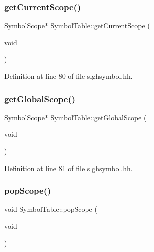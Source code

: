 \subsubsection{\texorpdfstring{getCurrentScope()}{getCurrentScope()}}
{\footnotesize\ttfamily \mbox{\hyperlink{class_symbol_scope}{Symbol\+Scope}}$\ast$ Symbol\+Table\+::get\+Current\+Scope (\begin{DoxyParamCaption}\item[{void}]{ }\end{DoxyParamCaption})\hspace{0.3cm}{\ttfamily [inline]}}



Definition at line 80 of file slghsymbol.\+hh.

\mbox{\label{class_symbol_table_a66d6512a45da8f2fc3d12b2d0993b9c9}} 
\subsubsection{\texorpdfstring{getGlobalScope()}{getGlobalScope()}}
{\footnotesize\ttfamily \mbox{\hyperlink{class_symbol_scope}{Symbol\+Scope}}$\ast$ Symbol\+Table\+::get\+Global\+Scope (\begin{DoxyParamCaption}\item[{void}]{ }\end{DoxyParamCaption})\hspace{0.3cm}{\ttfamily [inline]}}



Definition at line 81 of file slghsymbol.\+hh.

\mbox{\label{class_symbol_table_a66df4cebfc5231736341e3d2845dc298}} 
\subsubsection{\texorpdfstring{popScope()}{popScope()}}
{\footnotesize\ttfamily void Symbol\+Table\+::pop\+Scope (\begin{DoxyParamCaption}\item[{void}]{ }\end{DoxyParamCaption})}



